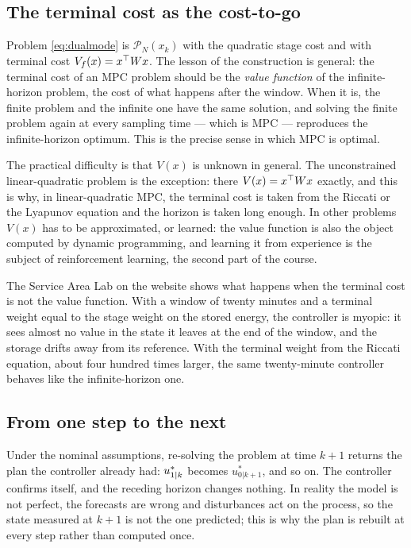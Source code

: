 \subsection{The terminal cost as the cost-to-go}

Problem \eqref{eq:dualmode} is $\mathcal{P}_N(x_k)$ with the quadratic stage cost and with
terminal cost $V_f(x) = x^{\top} W x$. The lesson of the construction is general: the terminal cost
of an MPC problem should be the \emph{value function} of the infinite-horizon problem, the cost
of what happens after the window. When it is, the finite problem and the infinite one have the
same solution, and solving the finite problem again at every sampling time --- which is MPC ---
reproduces the infinite-horizon optimum. This is the precise sense in which MPC is optimal.

The practical difficulty is that $V(x)$ is unknown in general. The unconstrained
linear-quadratic problem is the exception: there $V(x) = x^{\top} W x$ exactly, and this is why, in
linear-quadratic MPC, the terminal cost is taken from the Riccati or the Lyapunov equation and
the horizon is taken long enough. In other problems $V(x)$ has to be approximated, or learned:
the value function is also the object computed by dynamic programming, and learning it from
experience is the subject of reinforcement learning, the second part of the course.

\begin{remark}
The Service Area Lab on the website shows what happens when the terminal cost is not the value
function. With a window of twenty minutes and a terminal weight equal to the stage weight on the
stored energy, the controller is myopic: it sees almost no value in the state it leaves at the
end of the window, and the storage drifts away from its reference. With the terminal weight
from the Riccati equation, about four hundred times larger, the same twenty-minute controller
behaves like the infinite-horizon one.
\end{remark}

\subsection{From one step to the next}

Under the nominal assumptions, re-solving the problem at time $k+1$ returns the plan the
controller already had: $u^*_{{1|k}}$ becomes $u^*_{0|k+1}$, and so on. The controller
confirms itself, and the receding horizon changes nothing. In reality the model is not perfect,
the forecasts are wrong and disturbances act on the process, so the state measured at $k+1$ is
not the one predicted; this is why the plan is rebuilt at every step rather than computed once.

